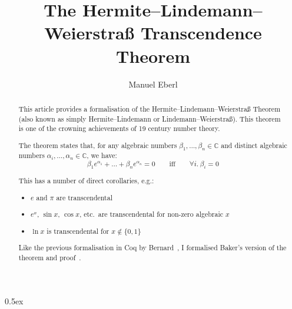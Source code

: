 \documentclass[11pt,a4paper]{article}
\begin{document}
\title{The Hermite--Lindemann--Weierstraß Transcendence Theorem}
\author{Manuel Eberl}
\maketitle

\begin{abstract}
This article provides a formalisation of the Hermite--Lindemann--Weierstraß Theorem
(also known as simply Hermite--Lindemann or Lindemann--Weierstraß). This theorem is one of the
crowning achievements of 19 century number theory.

The theorem states that, for any algebraic numbers $\beta_1, \ldots, \beta_n\in\mathbb{C}$ and
distinct algebraic numbers $\alpha_i, \ldots, \alpha_n\in\mathbb{C}$, we have:
\[\beta_1 e^{\alpha_1} + \ldots + \beta_n e^{\alpha_n} = 0 \quad\quad\text{iff}\quad\quad
  \forall i.\ \beta_i = 0\]

This has a number of direct corollaries, e.g.:
\begin{itemize}
\item $e$ and $\pi$ are transcendental
\item $e^x$, $\sin x$, $\cos x$, etc.\ are transcendental for non-zero algebraic $x$
\item $\ln x$ is transcendental for $x\notin\{0, 1\}$
\end{itemize}

Like the previous formalisation in Coq by Bernard~\cite{bernard}, I formalised Baker's version
of the theorem and proof~\cite{baker}.
\end{abstract}

\newpage
\tableofcontents
\newpage
\parindent 0pt\parskip 0.5ex



\nocite{baker}
\nocite{redheffer_steinberg}
\nocite{bernard}



\end{document}
